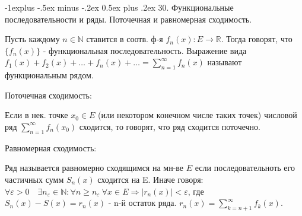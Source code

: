 \documentclass[unicode,10pt, landscape]{article}
\makeatletter
\renewcommand{\subsection}{\@startsection{subsection}{2}{0mm}%
                                {-1explus -.5ex minus -.2ex}%
                                {0.5ex plus .2ex}%
                                {\normalfont\normalsize\bfseries}}
\makeatother
\begin{document}
\begin{multicols}{4}

\subsection{30. Функциональные последовательности и ряды. Поточечная и равномерная сходимость.}
\begin{Def}
Пусть каждому $n \in \mathbb{N}$ ставится в соотв. ф-я $f_n(x): E \to \mathbb{R}$. Тогда говорят, что $\{f_n(x)\}$ - функциональная последовательность.
Выражение вида $f_1(x) + f_2(x) + \ldots + f_n(x) + \ldots = \sum_{n=1}^\infty f_n(x)$ называют функциональным рядом.
\end{Def}
Поточечная сходимость:
\begin{Def}
Если в нек. точке $x_0 \in E$ (или некотором конечном числе таких точек) числовой ряд $\sum_{n=1}^\infty f_n(x_0)$ сходится, то говорят, что ряд сходится поточечно.
\end{Def}
Равномерная сходимость:
\begin{Def}
Ряд называется равномерно сходящимся на мн-ве $E$ если последовательноть его частичных сумм $S_n(x)$ сходится на E. Иначе говоря: $\forall \varepsilon >0 \quad \exists n_{ \varepsilon  }\in \mathbb{N}: \forall n \ge n_\varepsilon \  \forall x \in E  \Rightarrow \left|r_n(x)\right| < \varepsilon$, где $ S_n(x)-S(x)=r_n(x)$ - n-й остаток ряда. $r_n(x) =\sum_{k = n + 1}^\infty f_k(x)$.
\end{Def}



\end{multicols}
\end{document}
